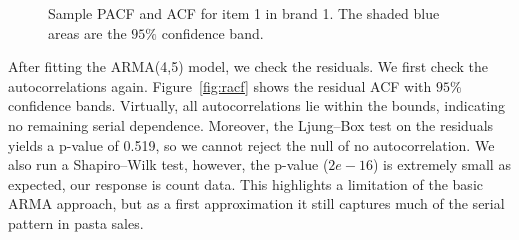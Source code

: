 \documentclass{article}
\begin{document}
\begin{figure}[!ht]
\centering
{}
\caption{Sample PACF and ACF for item 1 in brand 1. The shaded blue areas are the $95\%$ confidence band.}
\label{fig:acf}
\end{figure}

\noindent After fitting the ARMA(4,5) model, we check the residuals. We first check the autocorrelations again. Figure~\ref{fig:racf} shows the residual ACF with $95\%$ confidence bands. Virtually, all autocorrelations lie within the bounds, indicating no remaining serial dependence. Moreover, the Ljung–Box test on the residuals yields a p-value of 0.519, so we cannot reject the null of no autocorrelation. We also run a Shapiro–Wilk test, however, the p-value ($2e-16$) is extremely small  as expected, our response is count data. This highlights a limitation of the basic ARMA approach, but as a first approximation it still captures much of the serial pattern in pasta sales.
\end{document}
